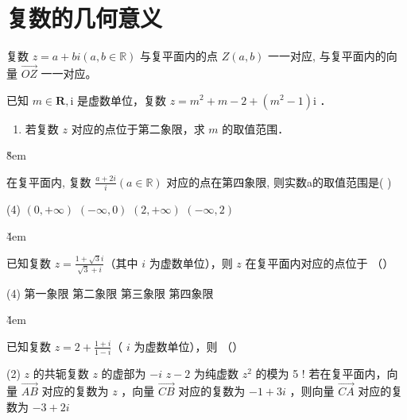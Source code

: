 \section{复数的几何意义}

\begin{definition}[复数的几何意义]
    复数 $z=a+bi(a,b\in \mathbb{R})$ 与复平面内的点 $Z(a,b)$ 一一对应, 与复平面内的向量 $\overrightarrow{OZ}$ 一一对应。
\end{definition}

\begin{example}
    已知 $m \in \mathbf{R}, \mathrm{i}$ 是虚数单位，复数 $z=m^2+m-2+\left(m^2-1\right) \mathrm{i}$ ．
    \begin{enumerate}
        \item 若复数 $z$ 对应的点位于第二象限，求 $m$ 的取值范围．
    \end{enumerate}
\end{example}

\v{8em}

\begin{example}
    在复平面内, 复数 $\frac{a+2i}{i}(a\in \mathbb{R})$ 对应的点在第四象限, 则实数a的取值范围是( \quad )
    \begin{tasks}(4)
        \task $(0,+\infty)$
        \task $(-\infty,0)$
        \task $(2,+\infty)$
        \task $(-\infty,2)$
    \end{tasks}
\end{example}

\v{4em}

\begin{example}
    已知复数 $z=\frac{1+\sqrt{3} i}{\sqrt{3}+i}$（其中 $i$ 为虚数单位），则 $z$ 在复平面内对应的点位于 （\qquad）
    \begin{tasks}(4)
        \task 第一象限
        \task 第二象限
        \task 第三象限
        \task 第四象限
    \end{tasks}
\end{example}

\v{4em}

\begin{example}
    已知复数 $z=2+\frac{1+i}{1-i}$（ $i$ 为虚数单位），则 （\qquad）
    \begin{tasks}(2)
        \task $z$ 的共轭复数 $z$ 的虚部为 $-i$
        \task $z-2$ 为纯虚数
        \task $z^2$ 的模为 5
        \task! 若在复平面内，向量 $\overrightarrow{A B}$ 对应的复数为 $z$ ，向量 $\overrightarrow{C B}$ 对应的复数为 $-1+3 i$ ，则向量 $\overrightarrow{C A}$ 对应的复数为 $-3+2 i$
    \end{tasks}
\end{example}

